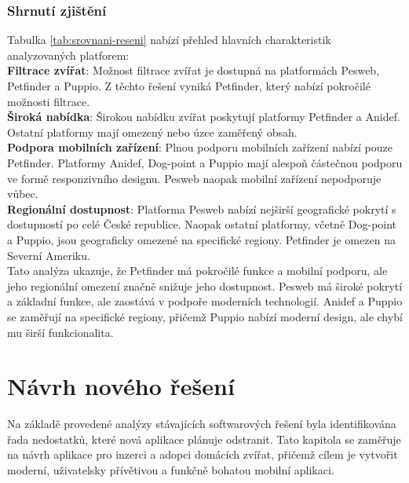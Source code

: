 \documentclass[12pt,a4paper]{report}
\begin{document}
\subsection{Shrnutí zjištění}

Tabulka \ref{tab:srovnani-reseni} nabízí přehled hlavních charakteristik analyzovaných platforem:\\

\noindent \textbf{Filtrace zvířat}: Možnost filtrace zvířat je dostupná na platformách Pesweb, Petfinder a Puppio. Z těchto řešení vyniká Petfinder, který nabízí pokročilé možnosti filtrace.\\

\noindent \textbf{Široká nabídka}: Širokou nabídku zvířat poskytují platformy Petfinder a Anidef. Ostatní platformy mají omezený nebo úzce zaměřený obsah.\\

\noindent \textbf{Podpora mobilních zařízení}: Plnou podporu mobilních zařízení nabízí pouze Petfinder. Platformy Anidef, Dog-point a Puppio mají alespoň částečnou podporu ve formě responzivního designu. Pesweb naopak mobilní zařízení nepodporuje vůbec.\\

\noindent \textbf{Regionální dostupnost}: Platforma Pesweb nabízí nejširší geografické pokrytí s dostupností po celé České republice. Naopak ostatní platformy, včetně Dog-point a Puppio, jsou geograficky omezené na specifické regiony. Petfinder je omezen na Severní Ameriku.\\

Tato analýza ukazuje, že Petfinder má pokročilé funkce a mobilní podporu, ale jeho regionální omezení značně snižuje jeho dostupnost. Pesweb má široké pokrytí a základní funkce, ale zaostává v podpoře moderních technologií. Anidef a Puppio se zaměřují na specifické regiony, přičemž Puppio nabízí moderní design, ale chybí mu širší funkcionalita.\\


\chapter{Návrh nového řešení}

Na základě provedené analýzy stávajících softwarových řešení byla identifikována řada nedostatků, které nová aplikace plánuje odstranit. Tato kapitola se zaměřuje na návrh aplikace pro inzerci a adopci domácích zvířat, přičemž cílem je vytvořit moderní, uživatelsky přívětivou a funkčně bohatou mobilní aplikaci.
\end{document}

